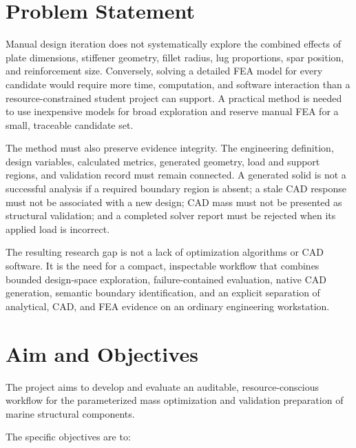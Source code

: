 \section{Problem Statement}
\label{sec:problem-statement}

Manual design iteration does not systematically explore the combined effects
of plate dimensions, stiffener geometry, fillet radius, lug proportions, spar
position, and reinforcement size. Conversely, solving a detailed FEA model
for every candidate would require more time, computation, and software
interaction than a resource-constrained student project can support. A
practical method is needed to use inexpensive models for broad exploration
and reserve manual FEA for a small, traceable candidate set.

The method must also preserve evidence integrity. The engineering definition,
design variables, calculated metrics, generated geometry, load and support
regions, and validation record must remain connected. A generated solid is not
a successful analysis if a required boundary region is absent; a stale CAD
response must not be associated with a new design; CAD mass must not be
presented as structural validation; and a completed solver report must be
rejected when its applied load is incorrect.

The resulting research gap is not a lack of optimization algorithms or CAD
software. It is the need for a compact, inspectable workflow that combines
bounded design-space exploration, failure-contained evaluation, native CAD
generation, semantic boundary identification, and an explicit separation of
analytical, CAD, and FEA evidence on an ordinary engineering workstation.

\section{Aim and Objectives}
\label{sec:objectives}

The project aims to develop and evaluate an auditable, resource-conscious
workflow for the parameterized mass optimization and validation preparation
of marine structural components.

The specific objectives are to:

